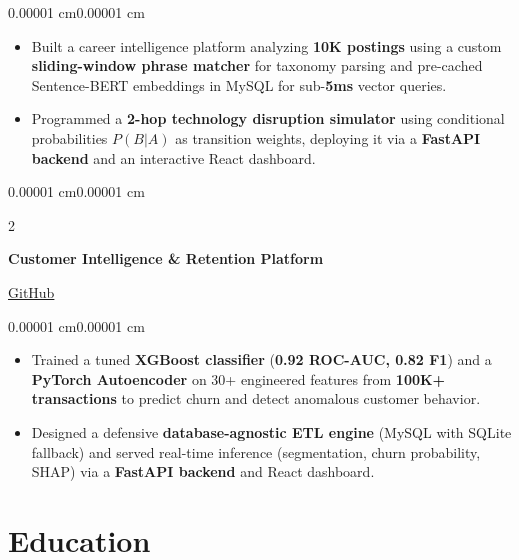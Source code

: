 \documentclass[10pt, letterpaper]{article}
\newenvironment{highlights}{
    \begin{itemize}[
        topsep=0.10 cm,
        parsep=0.10 cm,
        partopsep=0pt,
        itemsep=0pt,
        leftmargin=10pt
    ]
}{
    \end{itemize}
}
\newenvironment{onecolentry}{
    \begin{adjustwidth}{0.00001 cm}{0.00001 cm}
}{
    \end{adjustwidth}
}
\newenvironment{twocolentry}[2][]{
    \onecolentry
    \def\secondColumn{#2}
    \setcolumnwidth{\fill, 4.5 cm}
    \begin{paracol}{2}
}{
    \switchcolumn \raggedleft \secondColumn
    \end{paracol}
    \endonecolentry
}
\begin{document}
\vspace{0.06cm}

\begin{onecolentry}
\begin{highlights}
\item Built a career intelligence platform analyzing \textbf{10K postings} using a custom \textbf{sliding-window phrase matcher} for taxonomy parsing and pre-cached Sentence-BERT embeddings in MySQL for sub-\textbf{5ms} vector queries.
\item Programmed a \textbf{2-hop technology disruption simulator} using conditional probabilities $P(B|A)$ as transition weights, deploying it via a \textbf{FastAPI backend} and an interactive React dashboard.
\end{highlights}
\end{onecolentry}

\vspace{0.08cm}

\begin{twocolentry}{\href{https://github.com/Verma-Rohil/customer-intelligence-platform}{\textcolor{myblue}{ GitHub}}}
\textbf{Customer Intelligence \& Retention Platform}
\end{twocolentry}

\vspace{0.04cm}

\begin{onecolentry}
\begin{highlights}
\item Trained a tuned \textbf{XGBoost classifier} (\textbf{0.92 ROC-AUC, 0.82 F1}) and a \textbf{PyTorch Autoencoder} on 30+ engineered features from \textbf{100K+ transactions} to predict churn and detect anomalous customer behavior.
\item Designed a defensive \textbf{database-agnostic ETL engine} (MySQL with SQLite fallback) and served real-time inference (segmentation, churn probability, SHAP) via a \textbf{FastAPI backend} and React dashboard.
\end{highlights}
\end{onecolentry}

\section{\textcolor{myblue}{\textbf{Education}}}
\end{document}
